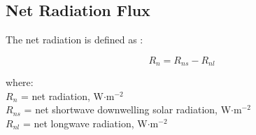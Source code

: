 \subsection{Net Radiation Flux}
\label{sec:rn}
The net radiation is defined as \parencite[Eq. 4]{linacre68}:

\begin{equation}
\label{eq:rn}
	R_n = R_{ns} - R_{nl}
\end{equation}

\noindent where: \\
\indent $R_n$ = net radiation, W$\cdot$m$^{-2}$ \\
\indent $R_{ns}$ = net shortwave downwelling solar radiation, W$\cdot$m$^{-2}$ \\
\indent $R_{nl}$ = net longwave radiation, W$\cdot$m$^{-2}$ \\

